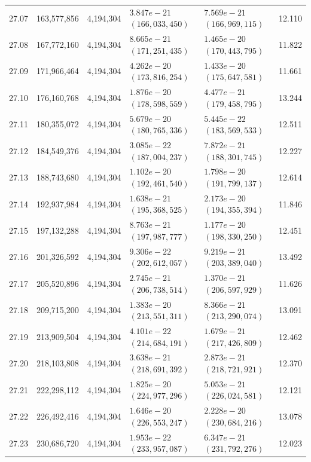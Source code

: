 \documentclass[11pt]{article}
\theoremstyle{definition}
\begin{document}
\begin{longtable}{@{}c r r >{\raggedleft\arraybackslash}p{34mm} >{\raggedleft\arraybackslash}p{34mm} r@{}}
27.07 & 163{,}577{,}856 & 4{,}194{,}304 & $3.847e-21$ $(166{,}033{,}450)$ & $7.569e-21$ $(166{,}969{,}115)$ & 12.110 \\
27.08 & 167{,}772{,}160 & 4{,}194{,}304 & $8.665e-21$ $(171{,}251{,}435)$ & $1.465e-20$ $(170{,}443{,}795)$ & 11.822 \\
27.09 & 171{,}966{,}464 & 4{,}194{,}304 & $4.262e-20$ $(173{,}816{,}254)$ & $1.433e-20$ $(175{,}647{,}581)$ & 11.661 \\
27.10 & 176{,}160{,}768 & 4{,}194{,}304 & $1.876e-20$ $(178{,}598{,}559)$ & $4.477e-21$ $(179{,}458{,}795)$ & 13.244 \\
27.11 & 180{,}355{,}072 & 4{,}194{,}304 & $5.679e-20$ $(180{,}765{,}336)$ & $5.445e-22$ $(183{,}569{,}533)$ & 12.511 \\
27.12 & 184{,}549{,}376 & 4{,}194{,}304 & $3.085e-22$ $(187{,}004{,}237)$ & $7.872e-21$ $(188{,}301{,}745)$ & 12.227 \\
27.13 & 188{,}743{,}680 & 4{,}194{,}304 & $1.102e-20$ $(192{,}461{,}540)$ & $1.798e-20$ $(191{,}799{,}137)$ & 12.614 \\
27.14 & 192{,}937{,}984 & 4{,}194{,}304 & $1.638e-21$ $(195{,}368{,}525)$ & $2.173e-20$ $(194{,}355{,}394)$ & 11.846 \\
27.15 & 197{,}132{,}288 & 4{,}194{,}304 & $8.763e-21$ $(197{,}987{,}777)$ & $1.177e-20$ $(198{,}330{,}250)$ & 12.451 \\
27.16 & 201{,}326{,}592 & 4{,}194{,}304 & $9.306e-22$ $(202{,}612{,}057)$ & $9.219e-21$ $(203{,}389{,}040)$ & 13.492 \\
27.17 & 205{,}520{,}896 & 4{,}194{,}304 & $2.745e-21$ $(206{,}738{,}514)$ & $1.370e-21$ $(206{,}597{,}929)$ & 11.626 \\
27.18 & 209{,}715{,}200 & 4{,}194{,}304 & $1.383e-20$ $(213{,}551{,}311)$ & $8.366e-21$ $(213{,}290{,}074)$ & 13.091 \\
27.19 & 213{,}909{,}504 & 4{,}194{,}304 & $4.101e-22$ $(214{,}684{,}191)$ & $1.679e-21$ $(217{,}426{,}809)$ & 12.462 \\
27.20 & 218{,}103{,}808 & 4{,}194{,}304 & $3.638e-21$ $(218{,}691{,}392)$ & $2.873e-21$ $(218{,}721{,}921)$ & 12.370 \\
27.21 & 222{,}298{,}112 & 4{,}194{,}304 & $1.825e-20$ $(224{,}977{,}296)$ & $5.053e-21$ $(226{,}024{,}581)$ & 12.121 \\
27.22 & 226{,}492{,}416 & 4{,}194{,}304 & $1.646e-20$ $(226{,}553{,}247)$ & $2.228e-20$ $(230{,}684{,}216)$ & 13.078 \\
27.23 & 230{,}686{,}720 & 4{,}194{,}304 & $1.953e-22$ $(233{,}957{,}087)$ & $6.347e-21$ $(231{,}792{,}276)$ & 12.023 \\

\end{longtable}
\end{document}

